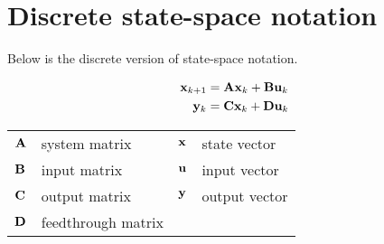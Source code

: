 \section{Discrete state-space notation}

Below is the discrete version of state-space notation.
\begin{definition}%
  \begin{align}
    \mathbf{x}_{k+1} &= \mathbf{A}\mathbf{x}_k + \mathbf{B}\mathbf{u}_k \label{eq:disc_ss_x} \\
    \mathbf{y}_k &= \mathbf{C}\mathbf{x}_k + \mathbf{D}\mathbf{u}_k \label{eq:disc_ss_y}
  \end{align}
  \begin{figurekey}
    \begin{tabular}{llll}
      $\mathbf{A}$ & system matrix      & $\mathbf{x}$ & state vector \\
      $\mathbf{B}$ & input matrix       & $\mathbf{u}$ & input vector \\
      $\mathbf{C}$ & output matrix      & $\mathbf{y}$ & output vector \\
      $\mathbf{D}$ & feedthrough matrix &  &  \\
    \end{tabular}
  \end{figurekey}
\end{definition}
